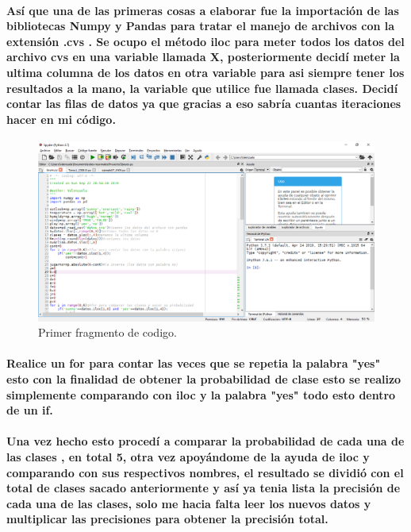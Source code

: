 \documentclass[10pt,a4paper]{article}
\begin{document}
\paragraph{As\'i que una de las primeras cosas a elaborar fue la importaci\'on de las bibliotecas Numpy y Pandas para tratar el manejo de archivos con la extensi\'on .cvs . Se ocupo el m\'etodo iloc para meter todos los datos del archivo cvs en una variable llamada X, posteriormente decid\'i meter la ultima columna de los datos en otra variable para asi siempre tener los resultados a la mano, la variable que utilice fue llamada clases. Decid\'i contar las filas de datos ya que gracias a eso sabr\'ia cuantas iteraciones hacer en mi c\'odigo. }
\begin{figure}[h]
\includegraphics[scale=0.3] {codigo1.png}
\caption{Primer fragmento de codigo.}
\label{fig:Binarizacion}
\end{figure}

\paragraph{Realice un for para contar las veces que se repetia la palabra "yes" esto con la finalidad de obtener la probabilidad de clase esto se realizo simplemente comparando con iloc y la palabra "yes" todo esto dentro de un if.}

\paragraph{Una vez hecho esto procedí a comparar la probabilidad de cada una de las clases , en total 5, otra vez apoy\'andome de la ayuda de iloc y comparando con sus respectivos nombres, el resultado se dividi\'o con el total de clases sacado anteriormente y as\'i ya tenia lista la precisi\'on de cada una de las clases, solo me hacia falta leer los nuevos datos y multiplicar las precisiones para obtener la precisi\'on total.}
\end{document}
